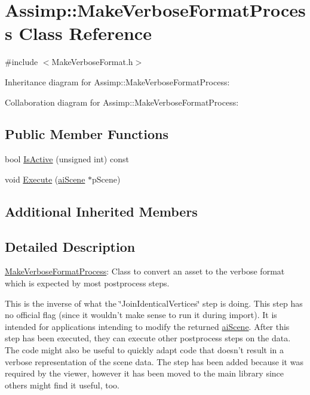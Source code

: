 \hypertarget{class_assimp_1_1_make_verbose_format_process}{\section{Assimp\+:\+:Make\+Verbose\+Format\+Process Class Reference}
\label{class_assimp_1_1_make_verbose_format_process}
}


{\ttfamily \#include $<$Make\+Verbose\+Format.\+h$>$}



Inheritance diagram for Assimp\+:\+:Make\+Verbose\+Format\+Process\+:


Collaboration diagram for Assimp\+:\+:Make\+Verbose\+Format\+Process\+:
\subsection*{Public Member Functions}
\begin{DoxyCompactItemize}
\item 
bool \hyperlink{class_assimp_1_1_make_verbose_format_process_affcb3d3c63636428b52b8dee9a6b5319}{Is\+Active} (unsigned int) const 
\item 
void \hyperlink{class_assimp_1_1_make_verbose_format_process_a62d77fc949165c31184d4aa15673beb3}{Execute} (\hyperlink{structai_scene}{ai\+Scene} $\ast$p\+Scene)
\end{DoxyCompactItemize}
\subsection*{Additional Inherited Members}


\subsection{Detailed Description}
\hyperlink{class_assimp_1_1_make_verbose_format_process}{Make\+Verbose\+Format\+Process}\+: Class to convert an asset to the verbose format which is expected by most postprocess steps.

This is the inverse of what the \char`\"{}\+Join\+Identical\+Vertices\char`\"{} step is doing. This step has no official flag (since it wouldn't make sense to run it during import). It is intended for applications intending to modify the returned \hyperlink{structai_scene}{ai\+Scene}. After this step has been executed, they can execute other postprocess steps on the data. The code might also be useful to quickly adapt code that doesn't result in a verbose representation of the scene data. The step has been added because it was required by the viewer, however it has been moved to the main library since others might find it useful, too. 

